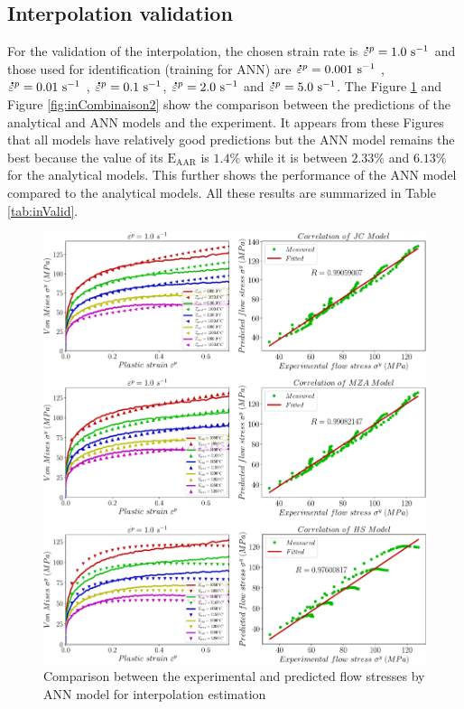 \documentclass[twoside,english,1p,final,sort&compress]{elsarticle}
\theoremstyle{plain}
\newcommand{\mdot}[1]{\accentset{\mbox{\bfseries .}}{#1}}
\newcommand{\AARE}{\text{E}_\text{AAR}}
\begin{document}
\subsection{Interpolation validation}
For the validation of the interpolation, the chosen strain rate is $\mdot{\varepsilon}^p = 1.0\ \text{s}^{-1}$ and those used for identification (training for ANN) are $\mdot{\varepsilon}^p = 0.001\ \text{s}^{-1}$ , $\mdot{\varepsilon}^p = 0.01\ \text{s}^{-1}$ , $\mdot{\varepsilon}^p = 0.1\ \text{s}^{-1}$, $\mdot{\varepsilon}^p = 2.0\ \text{s}^{-1}$  and $\mdot{\varepsilon}^p = 5.0\ \text{s}^{-1}$. The Figure \ref{fig:inCombinaison1} and Figure \ref{fig:inCombinaison2} show the comparison between the predictions of the analytical and ANN models and the experiment. It appears from these Figures that all models have relatively good predictions but the ANN model remains the best because the value of its $\AARE$ is $1.4\%$ while it is between $2.33\%$ and $6.13\%$ for the analytical models. This further shows the performance of the ANN model compared to the analytical models. All these results are summarized in Table \ref{tab:inValid}.
\begin{figure}[!ht]
\centering
\includegraphics[width=1.02\columnwidth]
{newFigures/inCombinaison1}
\caption{Comparison between the experimental and predicted flow stresses by ANN model for interpolation estimation}
\label{fig:inCombinaison1}
\end{figure}
\end{document}
